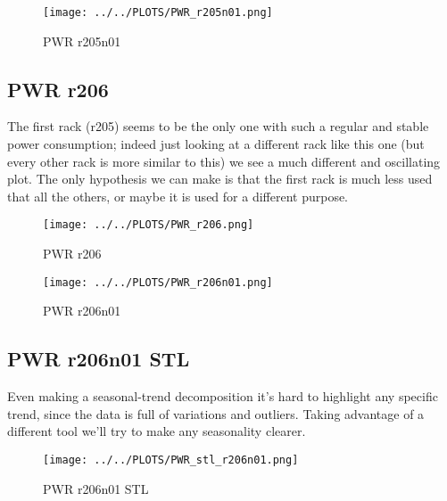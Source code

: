 \vspace{-20pt}

\begin{figure}[H]
\centering
\texttt{[image: ../../PLOTS/PWR\_r205n01.png]}
\captionsetup{skip=-10pt}
\caption{PWR r205n01}
\label{fig:PWR_r205n01}
\end{figure}

\subsection{PWR r206}
The first rack (r205) seems to be the only one with such a regular and stable power consumption; indeed just looking at a different rack like this one (but every other rack is more similar to this) we see a much different and oscillating plot. The only hypothesis we can make is that the first rack is much less used that all the others, or maybe it is used for a different purpose.

\vspace{-12pt}

\begin{figure}[H]
\centering
\texttt{[image: ../../PLOTS/PWR\_r206.png]}
\captionsetup{skip=-10pt}
\caption{PWR r206}
\label{fig:PWR_r206}
\end{figure}

\vspace{-20pt}

\begin{figure}[H]
\centering
\texttt{[image: ../../PLOTS/PWR\_r206n01.png]}
\captionsetup{skip=-10pt}
\caption{PWR r206n01}
\label{fig:PWR_r206n01}
\end{figure}

\subsection{PWR r206n01 STL}
Even making a seasonal-trend decomposition it’s hard to highlight any specific trend, since the data is full of variations and outliers. Taking advantage of a different tool we’ll try to make any seasonality clearer.

\vspace{-10pt}

\begin{figure}[H]
\centering
\texttt{[image: ../../PLOTS/PWR\_stl\_r206n01.png]}
\captionsetup{skip=-10pt}
\caption{PWR r206n01 STL}
\label{fig:PWR_stl_r206n01}
\end{figure}

